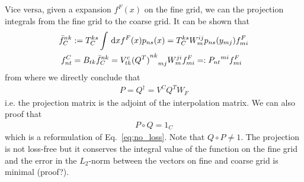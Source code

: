 Vice versa, given a expansion $f^F(x)$ on the fine grid, we can the projection integrals from the fine grid to the coarse grid. 
It can be shown that
\begin{align}
  \bar f_C^{nk} &:= T_C^{ks}\int \,\mathrm{d}x f^F(x)p_{ns}(x) = T_C^{ks}  W_m^{ij}p_{ns}(y_{mj}) f^F_{mi} \\
  f^C_{nt} &= B_{tk}\bar f_C^{nk} = V^c_{tk}  {{(Q^T)}^{nk}}_{mj}W_m^{ji} f^F_{mi} =: {P_{nt}}^{mi} f^F_{mi}
  \label{eq:basic_projection}
\end{align}
from where we directly conclude that 
\begin{align}
  P = Q^\dagger = V^C Q^T W_F
  \label{eq:projection_adjoint}
\end{align}
i.e. the projection matrix is the adjoint of the interpolation matrix.
We can also proof that
\begin{align}
  P\circ Q = 1_C
  \label{}
\end{align}
which is a reformulation of Eq.~\eqref{eq:no_loss}.
Note that $Q\circ P \neq 1$.
The projection is not loss-free but it conserves the integral
value of the function on the fine grid and the error in the 
$L_2$-norm between the vectors on fine and coarse grid is 
minimal (proof?).
